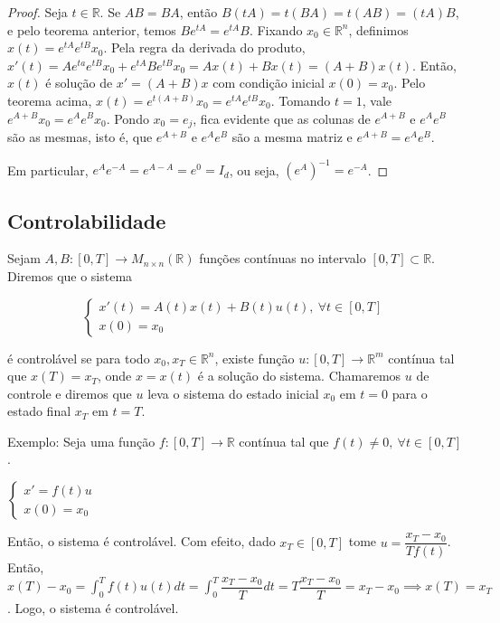 \documentclass[a4paper, 12pt]{article}
\renewcommand{\Bbb}{\mathbb}
\begin{document}
\begin{proof}
Seja $t\in \Bbb R$. Se $AB=BA$, então $B(tA)=t(BA)=t(AB)=(tA)B$, e pelo teorema anterior, temos $Be^{tA}=e^{tA}B$. Fixando $x_ 0 \in \Bbb R^n$, definimos $x(t)=e^{tA}e^{tB}x_ 0$. Pela regra da derivada do produto, $x'(t)=Ae^{ta}e^{tB}x_0 + e^{tA}Be^{tB}x_0=Ax(t)+Bx(t)=(A+B)x(t)$. Então, $x(t)$ é solução de $x'=(A+B)x$ com condição inicial $x(0)=x_0$. Pelo teorema acima, $x(t)=e^{t(A+B)}x_0=e^{tA}e^{tB}x_0$. Tomando $t=1$, vale $e^{A+B}x_0=e^Ae^Bx_0$. Pondo $x_0=e_j$, fica evidente que as colunas de $e^{A+B}$ e $e^Ae^B$ são as mesmas, isto é, que $e^{A+B}$ e $e^Ae^B$ são a mesma matriz e $e^{A+B}=e^Ae^B$.

Em particular, $e^Ae^{-A}=e^{A-A}=e^0=I_d$, ou seja, $(e^A)^{-1}=e^{-A}$.
\end{proof}
\subsection{Controlabilidade}
Sejam $A,B:[0,T] \to M_{n\times n}(\Bbb R)$ funções contínuas no intervalo $[0,T] \subset \Bbb R$. Diremos que o sistema 
\begin{center}
    $$
    \begin{cases}
    x'(t)=A(t)x(t)+B(t)u(t),\ \forall t\in [0,T] \\
    x(0)=x_0
    \end{cases}
    $$
\end{center}
é controlável se para todo $x_0,x_T\in \Bbb R^n$, existe função $u:[0,T]\to \Bbb R^m$ contínua tal que $x(T)=x_T$, onde $x=x(t)$ é a solução do sistema. Chamaremos $u$ de controle e diremos que $u$ leva o sistema do estado inicial $x_0$ em $t=0$ para o estado final $x_T$ em $t=T$.

Exemplo: Seja uma função $f:[0,T]\to \Bbb R$ contínua tal que $f(t)\neq 0,\ \forall t\in[0,T]$. 
\begin{center}
    $\begin{cases}
    x'=f(t)u\\ x(0)=x_0
    \end{cases}$
\end{center}
Então, o sistema é controlável. Com efeito, dado $x_T\in[0,T]$ tome $u=\dfrac{x_T-x_0}{Tf(t)}$. Então, $x(T)-x_0=\int^T_{0}f(t)u(t)dt=\int^T_0\dfrac{x_T-x_0}{T}dt=T\dfrac{x_T-x_0}{T}=x_T-x_0 \implies x(T)=x_T$. Logo, o sistema é controlável.
\end{document}
